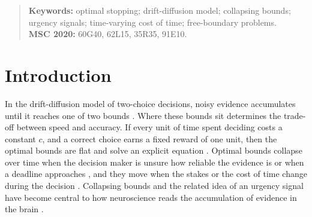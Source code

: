 \documentclass[11pt]{article}
\theoremstyle{definition}
\theoremstyle{remark}
\begin{document}
\begin{quote}
  \small
  \textbf{Keywords:} optimal stopping; drift-diffusion model; collapsing bounds; urgency signals;
  time-varying cost of time; free-boundary problems.\\
  \textbf{MSC 2020:} 60G40, 62L15, 35R35, 91E10.
\end{quote}

\section{Introduction}
\label{sec:intro}

In the drift-diffusion model of two-choice decisions, noisy evidence accumulates until it reaches
one of two bounds \citep{ratcliff2008,bogacz2006,gold2007}. Where these bounds sit determines the
trade-off between speed and accuracy. If every unit of time spent deciding costs a constant $c$,
and a correct choice earns a fixed reward of one unit, then the optimal bounds are flat and solve
an explicit equation \citep{wald1948,shiryaev1978,bogacz2006}. Optimal bounds collapse over time
when the decision maker is unsure how reliable the evidence is
\citep{drugowitsch2012,fudenberg2018,malhotra2018} or when a deadline approaches
\citep{frazier2007}, and they move when the stakes or the cost of time change during the decision
\citep{drugowitsch2012,barendregt2022}. Collapsing bounds and the related idea of an
urgency signal have become central to how neuroscience reads the accumulation of evidence in the
brain \citep{churchland2008,cisek2009,thura2012,hanks2014,murphy2016,hawkins2015,voskuilen2016,smith2025}.
\end{document}
